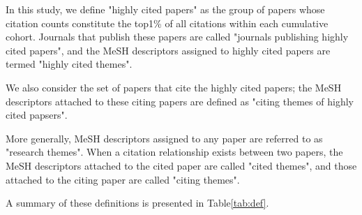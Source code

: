 In this study, we define "highly cited papers" as the group of papers whose citation counts constitute the top1\% of all citations within each cumulative cohort. Journals that publish these papers are called "journals publishing highly cited papers", and the MeSH descriptors assigned to highly cited papers are termed "highly cited themes".

We also consider the set of papers that cite the highly cited papers; the MeSH descriptors attached to these citing papers are defined as "citing themes of highly cited papsers".

More generally, MeSH descriptors assigned to any paper are referred to as "research themes". When a citation relationship exists between two papers, the MeSH descriptors attached to the cited paper are called "cited themes", and those attached to the citing paper are called "citing themes".

A summary of these definitions is presented in Table\ref{tab:def}.
